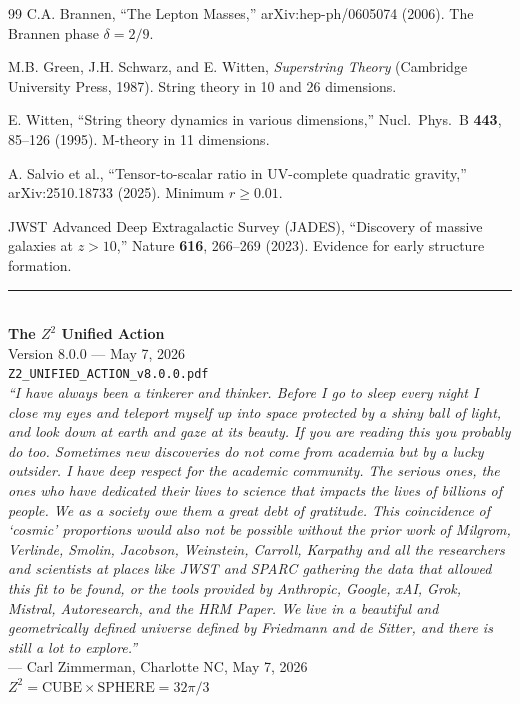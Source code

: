 \documentclass[11pt,a4paper]{article}
\theoremstyle{plain}
\theoremstyle{definition}
\theoremstyle{remark}
\begin{document}
\begin{thebibliography}{99}
 C.A. Brannen, ``The Lepton Masses,'' arXiv:hep-ph/0605074 (2006). The Brannen phase $\delta = 2/9$.

 M.B. Green, J.H. Schwarz, and E. Witten, \emph{Superstring Theory} (Cambridge University Press, 1987). String theory in 10 and 26 dimensions.

 E. Witten, ``String theory dynamics in various dimensions,'' Nucl.\ Phys.\ B \textbf{443}, 85--126 (1995). M-theory in 11 dimensions.

 A. Salvio et al., ``Tensor-to-scalar ratio in UV-complete quadratic gravity,'' arXiv:2510.18733 (2025). Minimum $r \geq 0.01$.

 JWST Advanced Deep Extragalactic Survey (JADES), ``Discovery of massive galaxies at $z > 10$,'' Nature \textbf{616}, 266--269 (2023). Evidence for early structure formation.

\end{thebibliography}

\vspace{2cm}
\begin{center}
\rule{0.8\textwidth}{0.5pt}\\[0.5cm]
\textbf{The $Z^2$ Unified Action}\\[0.3cm]
Version 8.0.0 --- May 7, 2026\\[0.3cm]
\texttt{Z2\_UNIFIED\_ACTION\_v8.0.0.pdf}\\[0.5cm]

\emph{``I have always been a tinkerer and thinker. Before I go to sleep every night I close my eyes and teleport myself up into space protected by a shiny ball of light, and look down at earth and gaze at its beauty. If you are reading this you probably do too. Sometimes new discoveries do not come from academia but by a lucky outsider. I have deep respect for the academic community. The serious ones, the ones who have dedicated their lives to science that impacts the lives of billions of people. We as a society owe them a great debt of gratitude. This coincidence of `cosmic' proportions would also not be possible without the prior work of Milgrom, Verlinde, Smolin, Jacobson, Weinstein, Carroll, Karpathy and all the researchers and scientists at places like JWST and SPARC gathering the data that allowed this fit to be found, or the tools provided by Anthropic, Google, xAI, Grok, Mistral, Autoresearch, and the HRM Paper. We live in a beautiful and geometrically defined universe defined by Friedmann and de Sitter, and there is still a lot to explore.''}\\[0.3cm]
--- Carl Zimmerman, Charlotte NC, May 7, 2026\\[0.5cm]

\textbf{$Z^2 = \text{CUBE} \times \text{SPHERE} = 32\pi/3$}
\end{center}
\end{document}
